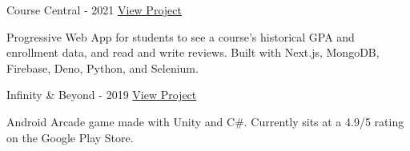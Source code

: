 

\begin{cventries}

  \cventry
    {} %
    {Course Central - 2021} %
    {\href{https://coursecentral.ca/}{View Project}} %
    {} %
    {
      \begin{cvitems} %
        \item {Progressive Web App for students to see a course's historical GPA and enrollment data, and read and write reviews. Built with Next.js, MongoDB, Firebase, Deno, Python, and Selenium.}
      \end{cvitems}
    }

  \cventry
    {} %
    {Infinity \& Beyond - 2019} %
    {\href{https://play.google.com/store/apps/details?id=com.KKSGames.InifintyandBeyond}{View Project}} %
    {} %
    {
      \begin{cvitems} %
        \item {Android Arcade game made with Unity and C\#. Currently sits at a 4.9/5 rating on the Google Play Store.}
      \end{cvitems}
    }


\end{cventries}
